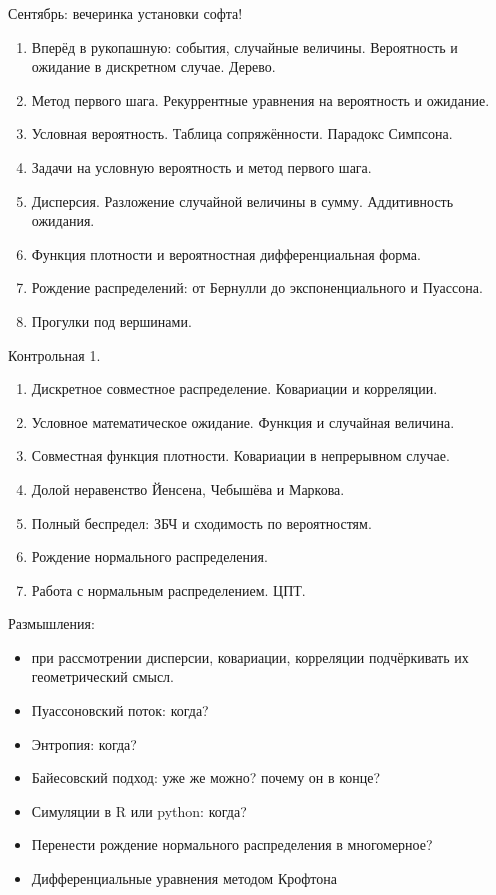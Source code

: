 \documentclass[12pt]{article}
\begin{document}
Сентябрь: вечеринка установки софта!


\begin{enumerate}
  \item Вперёд в рукопашную: события, случайные величины. Вероятность и ожидание в дискретном случае. Дерево.
  \item Метод первого шага. Рекуррентные уравнения на вероятность и ожидание.
  \item Условная вероятность. Таблица сопряжённости. Парадокс Симпсона.
  \item Задачи на условную вероятность и метод первого шага.
  \item Дисперсия. Разложение случайной величины в сумму. Аддитивность ожидания.
  \item Функция плотности и вероятностная дифференциальная форма.
  \item Рождение распределений: от Бернулли до экспоненциального и Пуассона.
  \item Прогулки под вершинами.
\end{enumerate}

Контрольная 1.

\begin{enumerate}[resume]
  \item Дискретное совместное распределение. Ковариации и корреляции.
  \item Условное математическое ожидание. Функция и случайная величина.
  \item Совместная функция плотности. Ковариации в непрерывном случае.
  \item Долой неравенство Йенсена, Чебышёва и Маркова.
  \item Полный беспредел: ЗБЧ и сходимость по вероятностям.
  \item Рождение нормального распределения.
  \item Работа с нормальным распределением. ЦПТ.
\end{enumerate}

Размышления:
\begin{itemize}
  \item при рассмотрении дисперсии, ковариации, корреляции подчёркивать их геометрический смысл.
  \item Пуассоновский поток: когда?
  \item Энтропия: когда?
  \item Байесовский подход: уже же можно? почему он в конце?
  \item Симуляции в R или python: когда?
  \item Перенести рождение нормального распределения в многомерное?
  \item Дифференциальные уравнения методом Крофтона
\end{itemize}
\end{document}

